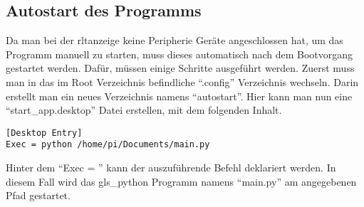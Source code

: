 \subsection{Autostart des Programms} \label{autostart}
Da man bei der \acs{rltanzeige} keine Peripherie Geräte angeschlossen hat, um das Programm manuell zu starten, muss dieses automatisch nach dem Bootvorgang gestartet werden. Dafür, müssen einige Schritte ausgeführt werden. \newline Zuerst muss man in das im Root Verzeichnis befindliche \enquote{.config} Verzeichnis wechseln. Darin erstellt man ein neues Verzeichnis namens \enquote{autostart}. Hier kann man nun eine \enquote{start\_app.desktop} Datei erstellen, mit dem folgenden Inhalt.
\begin{lstlisting}
[Desktop Entry]
Exec = python /home/pi/Documents/main.py
\end{lstlisting}
Hinter dem \enquote{Exec = } kann der auszuführende Befehl deklariert werden. In diesem Fall wird das \gls{gls_python} Programm namens \enquote{main.py} am angegebenen Pfad gestartet. \cite{Grace_Xing:2021}